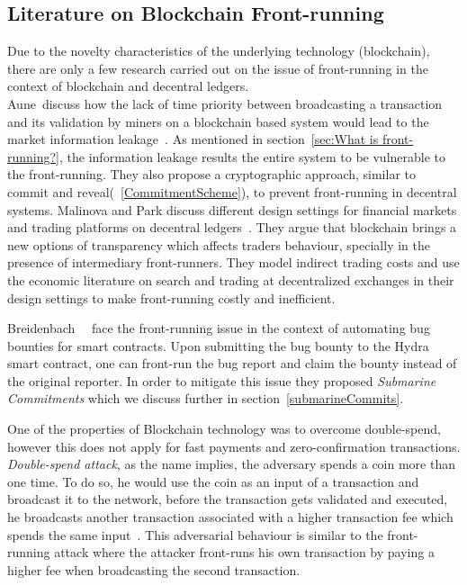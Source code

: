 \subsection{Literature on Blockchain Front-running}

Due to the novelty characteristics of the underlying technology (blockchain), there are only a few research carried out on the issue of front-running in the context of blockchain and decentral ledgers. \\
Aune~\etal discuss how the lack of time priority between broadcasting a transaction and its validation by miners on a blockchain based system would lead to the market information leakage~\cite{aune2017footprints}. As mentioned in section~\ref{sec:What is front-running?}, the information leakage results the entire system to be vulnerable to the front-running. They also propose a cryptographic approach, similar to commit and reveal(~\ref{CommitmentScheme}), to prevent front-running in decentral systems. %
Malinova and Park discuss different design settings for financial markets and trading platforms on decentral ledgers~\cite{malinova2017market}. They argue that blockchain brings a new options of transparency which affects traders behaviour, specially in the presence of intermediary front-runners. They model indirect trading costs and use the economic literature on search and trading at decentralized exchanges in their design settings to make front-running costly and inefficient.

Breidenbach~\etal~\cite{breidenbach2018enter} face the front-running issue in the context of automating bug bounties for smart contracts. Upon submitting the bug bounty to the Hydra smart contract, one can front-run the bug report and claim the bounty instead of the original reporter. In order to mitigate this issue they proposed \textit{Submarine Commitments} which we discuss further in section~\ref{submarineCommits}.

One of the properties of Blockchain technology was to overcome double-spend, however this does not apply for fast payments and zero-confirmation transactions. \textit{Double-spend attack}, as the name implies, the adversary spends a coin more than one time. To do so, he would use the coin as an input of a transaction and broadcast it to the network, before the transaction gets validated and executed, he broadcasts another transaction associated with a higher transaction fee which spends the same input~\cite{bamert2013have, karame2012double}. This adversarial behaviour is similar to the front-running attack where the attacker front-runs his own transaction by paying a higher fee when broadcasting the second transaction.

